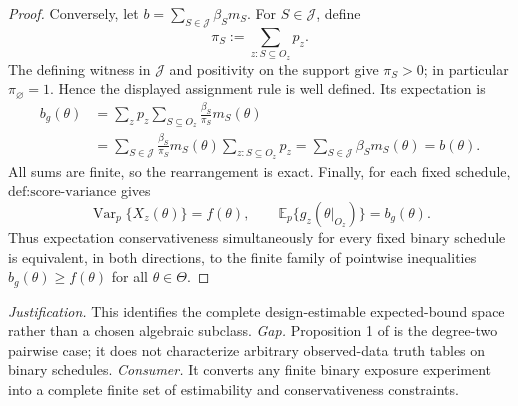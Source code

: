 \documentclass{article}
\begin{document}
\begin{proof}
Conversely, let \(b=\sum_{S\in\mathcal J}\beta_Sm_S\).  For \(S\in\mathcal J\), define
\[
 \pi_S:=\sum_{z:S\subseteq O_z}p_z.
\]
The defining witness in \(\mathcal J\) and positivity on the support give \(\pi_S>0\); in particular \(\pi_\varnothing=1\).  Hence the displayed assignment rule is well defined.  Its expectation is
\[
 \begin{aligned}
 b_g(\theta)
 &=\sum_zp_z\sum_{S\subseteq O_z}\frac{\beta_S}{\pi_S}m_S(\theta)\\
 &=\sum_{S\in\mathcal J}\frac{\beta_S}{\pi_S}m_S(\theta)
     \sum_{z:S\subseteq O_z}p_z
 =\sum_{S\in\mathcal J}\beta_Sm_S(\theta)=b(\theta).
 \end{aligned}
\]
All sums are finite, so the rearrangement is exact.  Finally, for each fixed schedule, \(\text{def:score-variance}\) gives
\[
 \operatorname{Var}_p\{X_z(\theta)\}=f(\theta),
 \quad\quad \mathbb E_p\{g_z(\theta|_{O_z})\}=b_g(\theta).
\]
Thus expectation conservativeness simultaneously for every fixed binary schedule is equivalent, in both directions, to the finite family of pointwise inequalities \(b_g(\theta)\ge f(\theta)\) for all \(\theta\in\Theta\).
\end{proof}
\par\smallskip\noindent \textit{Justification.} This identifies the complete design-estimable expected-bound space rather than a chosen algebraic subclass. \textit{Gap.} Proposition 1 of \cite{HarshawMiddletonSavje2026} is the degree-two pairwise case; it does not characterize arbitrary observed-data truth tables on binary schedules. \textit{Consumer.} It converts any finite binary exposure experiment into a complete finite set of estimability and conservativeness constraints.
\end{document}
